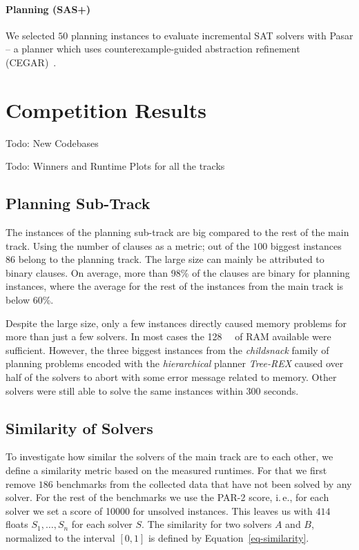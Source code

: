 \documentclass{elsarticle}
\newcommand{\todo}[1]{{\color{purple}Todo: #1}}
\begin{document}
\paragraph{Planning (SAS+)}
We selected $50$ planning instances to evaluate incremental SAT solvers with \textsf{Pasar} -- a planner which uses counter\-example-guided abstraction refinement (CEGAR)~\cite{Froleyks:2019:Pasar}. 


\section{Competition Results}
\label{sec:results}

\todo{New Codebases}

\todo{Winners and Runtime Plots for all the tracks}

\subsection{Planning Sub-Track}
The instances of the planning sub-track are big compared to the rest of the
main track. Using the number of clauses as a metric; out of the $100$ biggest
instances
$86$ belong to the planning track. The large size can mainly be attributed to
binary clauses. On average, more than $98$\% of the clauses are binary for
planning instances, where the average for the rest of the instances from the
main track is below $60$\%.

Despite the large size, only a few instances directly caused memory problems for
more than just a few solvers. In most cases the \SI{128}{\giga\byte} of RAM
available were sufficient.
However, the three biggest instances from the \emph{childsnack} family of
planning problems encoded with the \emph{hierarchical} planner \emph{Tree-REX}
caused over half of the solvers to abort with some error message related to
memory. Other solvers were still able to solve the same instances within $300$
seconds.

\subsection{Similarity of Solvers}
To investigate how similar the solvers of the main track are to each other, we
define a similarity metric based on the measured runtimes. For that we first
remove $186$ benchmarks from the collected data that have not been solved by any
solver. For the rest of the benchmarks we use the PAR-2 score,
i.\,e., for each solver we set a score of \num{10000} for unsolved instances.
This leaves us with $414$ floats
$S_{1},\dots,S_{n}$ for each solver $S$. The similarity for two solvers $A$
and $B$, normalized to the interval $[0,1]$ is defined
by Equation~\ref{eq-similarity}.
\end{document}
